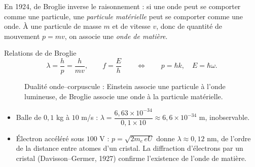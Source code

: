 En 1924, de Broglie inverse le raisonnement : si une onde peut se comporter
comme une particule, une \emph{particule matérielle} peut se comporter comme une
onde. À une particule de masse $m$ et de vitesse $v$, donc de quantité de
mouvement $p = mv$, on associe une \emph{onde de matière}.

\begin{definition}{Relations de de Broglie}
\[
  \lambda = \frac{h}{p} = \frac{h}{mv} ,
  \qquad
  f = \frac{E}{h}
  \qquad\Longleftrightarrow\qquad
  p = \hbar k ,\quad E = \hbar\omega .
\]
\end{definition}

\begin{figure}[!ht]
\centering
{}
\caption{Dualité onde--corpuscule : Einstein associe une particule à l'onde
lumineuse, de Broglie associe une onde à la particule matérielle.}
\end{figure}

\begin{remarque}
\begin{itemize}[nosep]
  \item Balle de $0{,}1$ kg à $10$ m/s : $\lambda = \dfrac{6{,}63\times10^{-34}}{0{,}1\times 10}
        \approx 6{,}6\times10^{-34}$ m, inobservable.
  \item Électron accéléré sous $100$ V : $p=\sqrt{2m_e\,eU}$ donne
        $\lambda \approx 0{,}12$ nm, de l'ordre de la distance entre atomes d'un cristal.
        La diffraction d'électrons par un cristal (Davisson--Germer, 1927) confirme
        l'existence de l'onde de matière.
\end{itemize}
\end{remarque}

